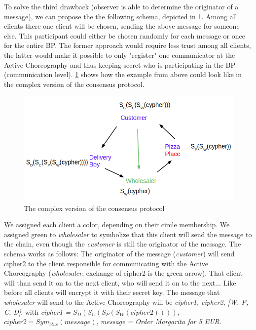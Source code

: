 \documentclass[runningheads]{llncs}
\begin{document}
To solve the third drawback (observer is able to determine the originator of a message), we can propose the the following schema, depicted in \ref{fig:complex}. Among all clients there one client will be chosen, sending the above message for someone else. This participant could either be chosen randomly for each message or once for the entire BP. The former approach would require less trust among all clients, the latter would make it possible to only "register" one communicator at the Active Choreography and thus keeping secret who is participating in the BP (communication level). \ref{fig:complex} shows how the example from above could look like in the complex version of the consensus protocol.

\begin{figure}
    \centering
    \includegraphics[scale=0.6]{complex.png}
    \caption{The complex version of the consensus protocol}
    \label{fig:complex}
\end{figure}


We assigned each client a color, depending on their circle membership. We assigned green to \textit{wholesaler} to symbolize that this client will send the message to the chain, even though the \textit{customer} is still the originator of the message. The schema works as follows: The originator of the message (\textit{customer}) will send cipher2 to the client responsible for communicating with the Active Choreography (\textit{wholesaler}, exchange of cipher2 is the green arrow). That client will than send it on to the next client, who will send it on to the next... Like before all clients will encrypt it with their secret key. The message that \textit{wholesaler} will send to the Active Choreography will be \textit{cipher1, cipher2, [W, P, C, D]}, with \textit{cipher1 =} $S_D(S_C(S_P(S_W(cipher2))))$, $cipher2 = Sym_{blue}(message)$, \textit{message = Order Margarita for 5 EUR}. 
\end{document}
